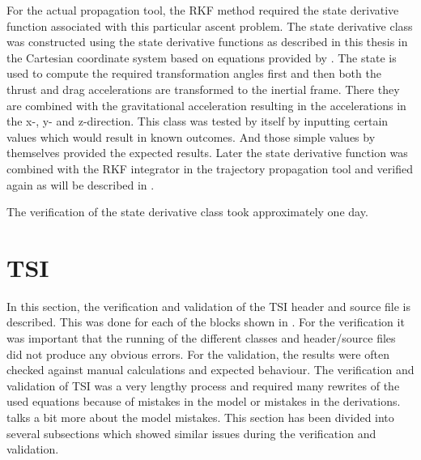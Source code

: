For the actual propagation tool, the \ac{RKF} method required the state derivative function associated with this particular ascent problem. The state derivative class was constructed using the state derivative functions as described in this thesis in the Cartesian coordinate system based on equations provided by \cite{mooij1994motion}. The state is used to compute the required transformation angles first and then both the thrust and drag accelerations are transformed to the inertial frame. There they are combined with the gravitational acceleration resulting in the accelerations in the x-, y- and z-direction. This class was tested by itself by inputting certain values which would result in known outcomes. And those simple values by themselves provided the expected results. Later the state derivative function was combined with the \ac{RKF} integrator in the trajectory propagation tool and verified again as will be described in . 


The verification of the state derivative class took approximately one day. 



\section{\acl{TSI}}
\label{sec:tsiverval}
In this section, the verification and validation of the \ac{TSI} header and source file is described. This was done for each of the blocks shown in . For the verification it was important that the running of the different classes and header/source files did not produce any obvious errors. For the validation, the results were often checked against manual calculations and expected behaviour. The verification and validation of \ac{TSI} was a very lengthy process and required many rewrites of the used equations because of mistakes in the model or mistakes in the derivations.  talks a bit more about the model mistakes. This section has been divided into several subsections which showed similar issues during the verification and validation.


